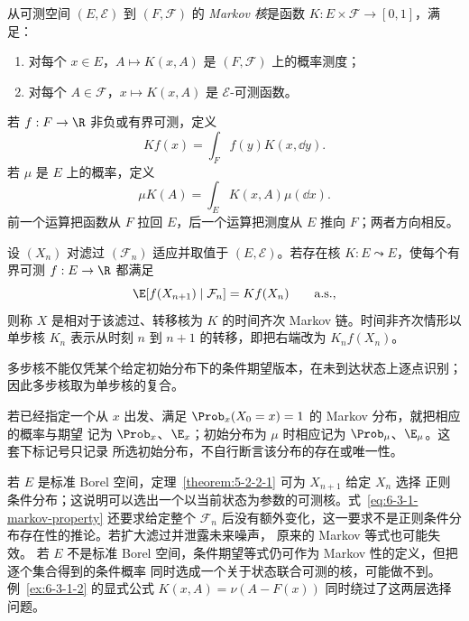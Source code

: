 \begin{definition}[Markov 核]\label{def:6-3-1-1}
从可测空间 $(E,\mathcal E)$ 到 $(F,\mathcal F)$ 的 \emph{Markov 核}是函数
$K:E\times\mathcal F\to[0,1]$，满足：
\begin{enumerate}
 \item 对每个 $x\in E$，$A\mapsto K(x,A)$ 是 $(F,\mathcal F)$ 上的概率测度；
 \item 对每个 $A\in\mathcal F$，$x\mapsto K(x,A)$ 是 $\mathcal E$-可测函数。
\end{enumerate}
若 $f:F\to\R$ 非负或有界可测，定义
\[
 Kf(x)=\int_F f(y)K(x,\dd y).
\]
若 $\mu$ 是 $E$ 上的概率，定义
\[
 \mu K(A)=\int_EK(x,A)\mu(\dd x).
\]
前一个运算把函数从 $F$ 拉回 $E$，后一个运算把测度从 $E$ 推向 $F$；两者方向相反。
\end{definition}

\begin{definition}[Markov 性]\label{def:6-3-1-2}
设 $(X_n)$ 对滤过 $(\mathcal F_n)$ 适应并取值于 $(E,\mathcal E)$。若存在核
$K:E\leadsto E$，使每个有界可测 $f:E\to\R$ 都满足
\begin{equation}\label{eq:6-3-1-markov-property}
 \E[f(X_{n+1})\mid\mathcal F_n]=Kf(X_n)\qquad\text{a.s.},
\end{equation}
则称 $X$ 是相对于该滤过、转移核为 $K$ 的时间齐次 Markov 链。时间非齐次情形以
单步核 $K_n$ 表示从时刻 $n$ 到 $n+1$ 的转移，即把右端改为 $K_nf(X_n)$。
\end{definition}

多步核不能仅凭某个给定初始分布下的条件期望版本，在未到达状态上逐点识别；因此多步核取为单步核的复合。

若已经指定一个从 $x$ 出发、满足 $\Prob_x(X_0=x)=1$ 的 Markov 分布，就把相应的概率与期望
记为 $\Prob_x$、$\E_x$；初始分布为 $\mu$ 时相应记为 $\Prob_\mu$、$\E_\mu$。这套下标记号只记录
所选初始分布，不自行断言该分布的存在或唯一性。

\begin{remark}\label{remark:6-3-1-rcd}
若 $E$ 是标准 Borel 空间，定理~\ref{theorem:5-2-2-1} 可为 $X_{n+1}$ 给定 $X_n$ 选择
正则条件分布；这说明可以选出一个以当前状态为参数的可测核。式~\eqref{eq:6-3-1-markov-property} 还要求给定整个
$\mathcal F_n$ 后没有额外变化，这一要求不是正则条件分布存在性的推论。若扩大滤过并泄露未来噪声，
原来的 Markov 等式也可能失效。
若 $E$ 不是标准 Borel 空间，条件期望等式仍可作为 Markov 性的定义，但把逐个集合得到的条件概率
同时选成一个关于状态联合可测的核，可能做不到。例~\ref{ex:6-3-1-2} 的显式公式
$K(x,A)=\nu(A-F(x))$ 同时绕过了这两层选择问题。
\end{remark}

